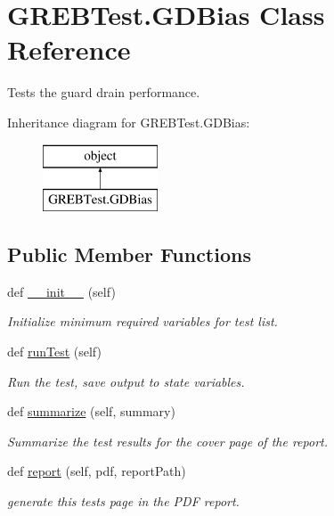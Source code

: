 \hypertarget{class_g_r_e_b_test_1_1_g_d_bias}{}\section{G\+R\+E\+B\+Test.\+G\+D\+Bias Class Reference}
\label{class_g_r_e_b_test_1_1_g_d_bias}


Tests the guard drain performance.  


Inheritance diagram for G\+R\+E\+B\+Test.\+G\+D\+Bias\+:\begin{figure}[H]
\begin{center}
\leavevmode
\includegraphics[height=2.000000cm]{class_g_r_e_b_test_1_1_g_d_bias}
\end{center}
\end{figure}
\subsection*{Public Member Functions}
\begin{DoxyCompactItemize}
\item 
def \hyperlink{class_g_r_e_b_test_1_1_g_d_bias_ac7f9e559681ac29efc4c27b3378cede2}{\+\_\+\+\_\+init\+\_\+\+\_\+} (self)
\begin{DoxyCompactList}\small\item\em Initialize minimum required variables for test list. \end{DoxyCompactList}\item 
def \hyperlink{class_g_r_e_b_test_1_1_g_d_bias_a321da21e9423c59f5b38fa3be84eac2a}{run\+Test} (self)
\begin{DoxyCompactList}\small\item\em Run the test, save output to state variables. \end{DoxyCompactList}\item 
def \hyperlink{class_g_r_e_b_test_1_1_g_d_bias_ae739a588383aa66af9452093d6e5b775}{summarize} (self, summary)
\begin{DoxyCompactList}\small\item\em Summarize the test results for the cover page of the report. \end{DoxyCompactList}\item 
def \hyperlink{class_g_r_e_b_test_1_1_g_d_bias_a46459b0db0d33a97664b1559046f2444}{report} (self, pdf, report\+Path)
\begin{DoxyCompactList}\small\item\em generate this test\textquotesingle{}s page in the P\+DF report. \end{DoxyCompactList}\end{DoxyCompactItemize}


